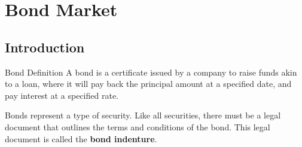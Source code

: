 \chapter{Bond Market}
\section{Introduction}

\begin{definitionbox}{Bond Definition}
    A bond is a certificate issued by a company to raise funds akin to a loan, where it will pay back the principal amount at a specified date, and pay interest at a specified rate.
\end{definitionbox}

Bonds represent a type of security. Like all securities, there must be a legal document that outlines the terms and conditions of the bond. This legal document is called the \textbf{bond indenture}.

